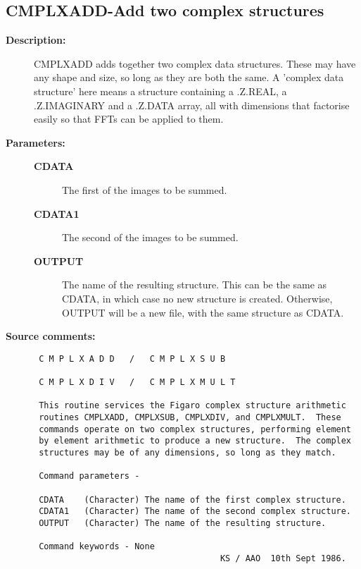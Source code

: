 \subsection{CMPLXADD-\label{CMPLXADD}Add two complex structures}
\begin{description}

\item [{\bf Description:}]
 CMPLXADD adds together two complex data structures.  These may
 have any shape and size, so long as they are both the same.  A
 'complex data structure' here means a structure containing a
 .Z.REAL, a .Z.IMAGINARY and a .Z.DATA array, all with dimensions
 that factorise easily so that FFTs can be applied to them.

\item [{\bf Parameters:}]
\begin{description}
\item [{\bf CDATA}]
 The first of the images to be summed.
\item [{\bf CDATA1}]
 The second of the images to be summed.
\item [{\bf OUTPUT}]
 The name of the resulting structure. This can
 be the same as CDATA, in which case no new structure is
 created.  Otherwise, OUTPUT will be a new file, with the
 same structure as CDATA.
\end{description}

\item [{\bf Source comments:}]
\begin{verbatim}
 C M P L X A D D   /   C M P L X S U B

 C M P L X D I V   /   C M P L X M U L T

 This routine services the Figaro complex structure arithmetic
 routines CMPLXADD, CMPLXSUB, CMPLXDIV, and CMPLXMULT.  These
 commands operate on two complex structures, performing element
 by element arithmetic to produce a new structure.  The complex
 structures may be of any dimensions, so long as they match.

 Command parameters -

 CDATA    (Character) The name of the first complex structure.
 CDATA1   (Character) The name of the second complex structure.
 OUTPUT   (Character) The name of the resulting structure.

 Command keywords - None
                                     KS / AAO  10th Sept 1986.
\end{verbatim}
\end{description}
